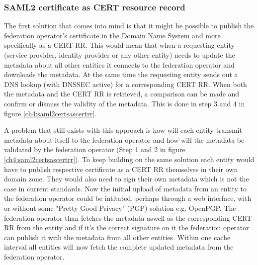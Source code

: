 \subsubsection{SAML2 certificate as CERT resource record}
\label{subsec:saml2-certificate-as-tlsa}
The first solution that comes into mind is that it might be possible to publish the federation operator's certificate in the Domain Name System and more specifically as a CERT RR\cite{rfc:4398}.
This would mean that when a requesting entity (service provider, identity provider or any other entity) needs to update the metadata about all other entities it connects to the federation operator and downloads the metadata.
At the same time the requesting entity sends out a DNS lookup (with DNSSEC active) for a corresponding CERT RR.
When both the metadata and the CERT RR is retrieved, a comparison can be made and confirm or dismiss the validity of the metadata.
This is done in step 3 and 4 in figure \ref{ch4:saml2certsascertrr}.

A problem that still exists with this approach is how will each entity transmit metadata about itself to the federation operator and how will the metadata be validated by the federation operator (Step 1 and 2 in figure \ref{ch4:saml2certsascertrr}).
To keep building on the same solution each entity would have to publish respective certificate as a CERT RR themselves in their own domain zone.
They would also need to sign their own metadata which is not the case in current standards. 
Now the initial upload of metadata from an entity to the federation operator could be intitated, perhaps through a web interface, with or without some "Pretty Good Privacy" (PGP) solution e.g. OpenPGP\cite{rfc:2440}.
The federation operator than fetches the metadata aswell as the corresponding CERT RR from the entity and if it's the correct signature on it the federation operator can publish it with the metadata from all other entities.
Within one cache interval all entities will now fetch the complete updated metadata from the federation operator.

